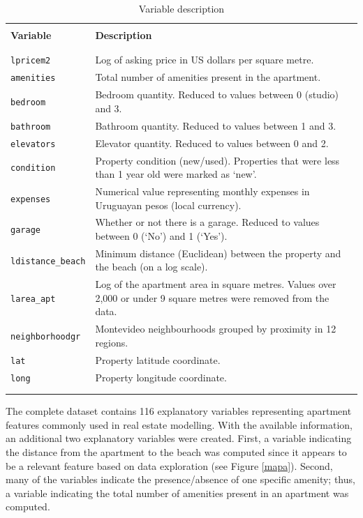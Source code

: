 \documentclass[smallextended,natbib]{svjour3}\usepackage[]{graphicx}\usepackage[]{xcolor}
\newcommand{\1}[1]{\mathbbm{1}_{#1}}
\begin{document}
\begin{table}[hbpt]
	\centering
	\caption{Variable description\label{tabvar} }
\scriptsize
\begin{tabular}{p{2.4cm}p{7cm}}
		\hline \\[-1.8ex] 
\textbf{Variable} &  	\textbf{Description} \\
		\hline \\[-1.8ex] 	\hline \\[-1.8ex] 

\texttt{lpricem2}  & Log of asking price in US dollars per square metre. \\ \hline
  
\texttt{amenities}  & Total number of amenities present in the apartment.\\
\texttt{bedroom}  & Bedroom quantity. Reduced to values between 0 (studio) and 3. \\
\texttt{bathroom}  & Bathroom quantity. Reduced to values between 1 and 3.\\
\texttt{elevators}  & Elevator quantity. Reduced to values between 0 and 2. \\
\texttt{condition}  & Property condition (new/used).  Properties that were less than 1 year old were marked as `new'.\\
\texttt{expenses}  &  Numerical value representing monthly expenses in Uruguayan pesos (local currency).\\
\texttt{garage}  & Whether or not there is a garage. Reduced to values between 0 (`No') and 1 (`Yes').\\ 
\texttt{ldistance\_beach}  & Minimum distance (Euclidean)  between  the property   and the beach (on a log scale). \\
\texttt{larea\_apt}  & Log of the apartment area in square metres. Values over 2,000 or under 9 square metres were removed from the data. \\
\texttt{neighborhoodgr}  &  Montevideo neighbourhoods grouped by proximity in 12 regions. \\ \hline
\texttt{lat} & Property latitude coordinate. \\
\texttt{long}  & Property longitude coordinate. \\
	\hline \\[-1.8ex] 	\hline \\[-1.8ex]  
	\end{tabular}
\end{table}

The complete dataset contains 116 explanatory variables representing apartment features commonly used in real estate modelling. With the available information, an additional two explanatory variables were created. First, a variable indicating the distance from the apartment to the beach was computed since it appears to be a relevant feature based on data exploration (see Figure \ref{mapa}). Second, many of the variables indicate the presence/absence of one specific amenity; thus, a variable indicating the total number of amenities present in an apartment was computed. 
\end{document}
